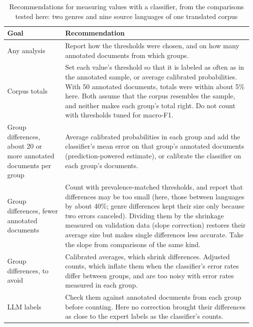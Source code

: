 \begin{table}[t]
\caption{Recommendations for measuring values with a classifier, from the comparisons tested here: two genres and nine source languages of one translated corpus}
\label{tab:recommendations}
\centering
\footnotesize
\begin{tabular}{@{}p{}p{}@{}}
\toprule
Goal & Recommendation \\
\midrule
\raggedright Any analysis & Report how the thresholds were chosen, and on how many annotated documents from which groups. \\
\addlinespace
\raggedright Corpus totals & Set each value's threshold so that it is labeled as often as in the annotated sample, or average calibrated probabilities. With 50 annotated documents, totals were within about 5\% here. Both assume that the corpus resembles the sample, and neither makes each group's total right. Do not count with thresholds tuned for macro-F1. \\
\addlinespace
\raggedright Group differences, about 20 or more annotated documents per group & Average calibrated probabilities in each group and add the classifier's mean error on that group's annotated documents (prediction-powered estimate), or calibrate the classifier on each group's documents. \\
\addlinespace
\raggedright Group differences, fewer annotated documents & Count with prevalence-matched thresholds, and report that differences may be too small (here, those between languages by about 40\%; genre differences kept their size only because two errors canceled). Dividing them by the shrinkage measured on validation data (slope correction) restores their average size but makes single differences less accurate. Take the slope from comparisons of the same kind. \\
\addlinespace
\raggedright Group differences, to avoid & Calibrated averages, which shrink differences. Adjusted counts, which inflate them when the classifier's error rates differ between groups, and are too noisy with error rates measured in each group. \\
\addlinespace
\raggedright LLM labels & Check them against annotated documents from each group before counting. Here no correction brought their differences as close to the expert labels as the classifier's counts. \\
\bottomrule
\end{tabular}
\end{table}
